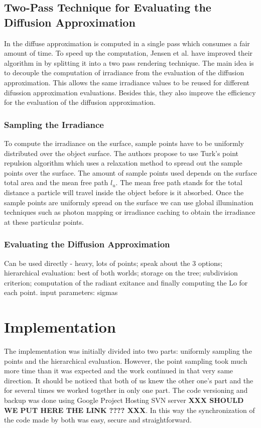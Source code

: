 \documentclass{article}
\begin{document}
\subsection{Two-Pass Technique for Evaluating the Diffusion Approximation}
In \cite{PracticalSSS} the diffuse approximation is computed in a single pass  which consumes a fair amount of time. To speed up the computation, Jensen et al. have improved their algorithm in \cite{HierarchicalSSS} by splitting it into a two pass rendering technique. The main idea is to decouple the computation of irradiance from the evaluation of the diffusion approximation. This allows the same irradiance values to be reused for different difussion approximation evaluations. Besides this, they also improve the efficiency for the evaluation of the diffusion approximation.

\subsubsection{Sampling the Irradiance}
To compute the irradiance on the surface, sample points have to be uniformly distributed over the object surface. The authors propose to use Turk's point repulsion algorithm \cite{Turk_Point_Repulsion} which uses a relaxation method to spread out the sample points over the surface. The amount of sample points used depends on the surface total area and the mean free path $l_u$. The mean free path stands for the total distance a particle will travel inside the object before is it absorbed. Once the sample points are uniformly spread on the surface we can use global illumination techniques such as photon mapping or irradiance caching to obtain the irradiance at these particular points.

\subsubsection{Evaluating the Diffusion Approximation}
Can be used directly - heavy, lots of points; speak about the 3 options; hierarchical evaluation: best of both worlds; storage on the tree; subdivision criterion; computation of the radiant exitance and finally computing the Lo for each point.
input parameters: sigmas

\section{Implementation}
The implementation was initially divided into two parts: uniformly sampling the points and the hierarchical evaluation. However, the point sampling took much more time than it was expected and the work continued in that very same direction. It should be noticed that both of us knew the other one's part and the for several times we worked together in only one part.\linebreak
The code versioning and backup was done using Google Project Hosting SVN server\textbf{  XXX SHOULD WE PUT HERE THE LINK ???? XXX}. In this way the synchronization of the code made by both was easy, secure and straightforward.
\end{document}
